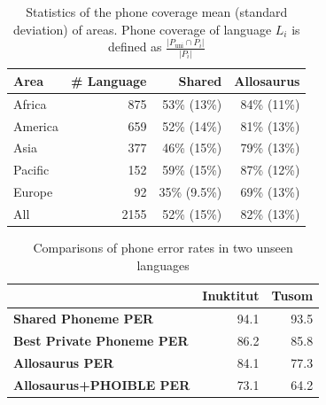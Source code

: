 \documentclass{article}
\newcommand{\drm}[1]{\textcolor{orange}{\small [#1 ---DRM]}}
\begin{document}
\begin{table}[t]
\begin{center}
    \caption{Statistics of the phone coverage mean (standard deviation) of areas. Phone coverage of language $L_i$ is defined as $\frac{| P_{\text{uni}} \cap P_{i}|}{|P_{i}|}$} \label{tab:family}
    \begin{tabular}{l r r r } 
    \toprule
    {\bf Area} & {\bf \# Language} & {\bf Shared} & {\bf Allosaurus} \\
    \midrule
     Africa & 875 & 53\% (13\%)&  84\% (11\%) \\
     America & 659 & 52\% (14\%) & 81\% (13\%) \\
    Asia & 377 & 46\% (15\%) & 79\% (13\%) \\
    Pacific & 152 & 59\% (15\%) & 87\% (12\%) \\
    Europe & 92 & 35\% (9.5\%) & 69\% (13\%) \\
    \midrule
    All & 2155 & 52\% (15\%) & 82\% (13\%) \\

    \bottomrule
    \end{tabular}
    \vspace{-2mm}
\end{center}
\end{table}

\begin{table}[t]
\begin{center}
    \caption{Comparisons of phone error rates in two unseen languages} \label{tab:unseen_results}
    \begin{tabular}{l r r} 
    \toprule
    & Inuktitut & Tusom \\
    \midrule
    \textbf{Shared Phoneme PER} & 94.1 & 93.5 \\
    \textbf{Best Private Phoneme PER} & 86.2 & 85.8 \\
    \midrule
    \textbf{Allosaurus PER} & 84.1 & 77.3  \\
    \textbf{Allosaurus+PHOIBLE PER} & 73.1 & 64.2 \\
    \bottomrule
    \end{tabular}
    \vspace{-2mm}
\end{center}
\end{table}
\end{document}
